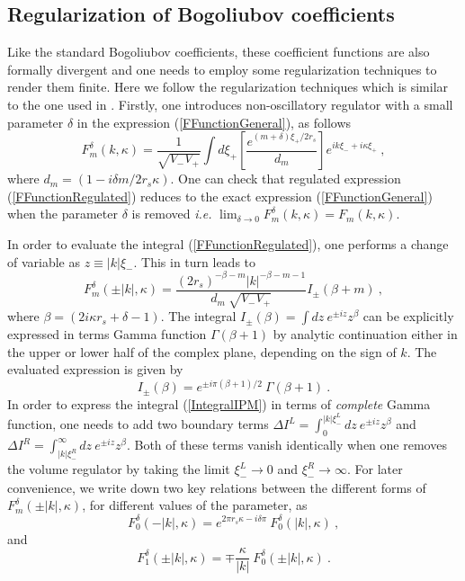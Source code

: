 \documentclass[aps,twocolumn,showpacs]{revtex4}
\def\kr{\kappa}
\def\rs{r_s}
\begin{document}
\subsection{Regularization of Bogoliubov coefficients}

Like the standard Bogoliubov coefficients, these coefficient functions are 
also formally divergent and one needs to employ some regularization techniques 
to render them finite. Here we follow the regularization techniques which is 
similar to the one used in \cite{Hossain:2014fma}. Firstly, one introduces 
non-oscillatory regulator with a small parameter $\delta$ in the expression 
(\ref{FFunctionGeneral}), as follows
%
\begin{equation}\label{FFunctionRegulated}
F_{m}^{\delta}(k,\kr) = \frac{1}{\sqrt{V_{-} V_{+}}} 
\int d\xi_{+} \left[\frac{e^{(m+\delta)\xi_{+}/2 \rs}}{d_m} \right]
e^{i k \xi_{-} + i \kr \xi_{+}}  ~,
\end{equation}
%
where $d_m = (1 - i\delta m/2\rs\kr)$. One can check that regulated expression 
(\ref{FFunctionRegulated}) reduces to the exact expression 
(\ref{FFunctionGeneral}) when the parameter $\delta$ is removed
\emph{i.e.} $\lim_{\delta\to0} F_{m}^{\delta}(k,\kr) = F_{m}(k,\kr)$.


In order to evaluate the integral (\ref{FFunctionRegulated}), one performs a
change of variable as $z \equiv |k| \xi_{-}$. This in turn leads to 
%
\begin{equation}\label{FFunctionEvaluated}
F_{m}^{\delta}(\pm|k|,\kr) = \frac{(2\rs)^{-\beta-m} |k|^{-\beta-m-1} }
{d_m ~\sqrt{V_{-} V_{+}}} I_{\pm}(\beta+m) ~,
\end{equation}
%
where $\beta = (2i\kr\rs + \delta - 1)$. The integral $I_{\pm}(\beta) = \int dz 
~e^{\pm i z} z^{\beta}$ can be explicitly expressed in terms Gamma function 
$\Gamma(\beta+1)$ by analytic continuation either in the upper or lower half of 
the complex plane, depending on the sign of $k$. The evaluated expression is 
given by
%
\begin{equation}\label{IntegralIPM}
I_{\pm}(\beta) = e^{\pm i \pi(\beta+1)/2} ~\Gamma(\beta+1)  ~.
\end{equation}
%
In order to express the integral (\ref{IntegralIPM}) in terms of \emph{complete}
Gamma function, one needs to add two boundary terms 
$\Delta I^{L} = \int_0^{|k|\xi_{-}^L} dz ~e^{\pm i z} z^{\beta}$ and 
$\Delta I^{R} = \int_{|k|\xi_{-}^R}^{\infty} dz ~e^{\pm i z} z^{\beta}$. Both 
of these terms vanish identically when one removes the volume regulator by 
taking the limit $\xi_{-}^L\to0$ and $\xi_{-}^R\to\infty$. 
%
For later convenience, we write down two key relations between the different 
forms of $F_{m}^{\delta}(\pm|k|,\kr)$, for different values of the parameter, as
%
\begin{equation}\label{F0F0Relation}
F_{0}^{\delta}(-|k|,\kr) = e^{2\pi\rs\kr - i\delta\pi}~F_{0}^{\delta}(|k|,\kr) 
~,
\end{equation}
%
and 
%
\begin{equation}\label{F0F1Relation}
F_{1}^{\delta}(\pm|k|,\kr) = \mp \frac{\kr}{|k|}~F_{0}^{\delta}(\pm|k|,\kr) ~.
\end{equation}
%
\end{document}
